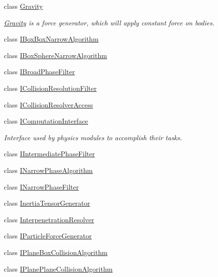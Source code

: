 \begin{DoxyCompactItemize}
\item 
class \mbox{\hyperlink{classr3_1_1_gravity}{Gravity}}
\begin{DoxyCompactList}\small\item\em \mbox{\hyperlink{classr3_1_1_gravity}{Gravity}} is a force generator, which will apply constant force on bodies. \end{DoxyCompactList}\item 
class \mbox{\hyperlink{classr3_1_1_i_box_box_narrow_algorithm}{I\+Box\+Box\+Narrow\+Algorithm}}
\item 
class \mbox{\hyperlink{classr3_1_1_i_box_sphere_narrow_algorithm}{I\+Box\+Sphere\+Narrow\+Algorithm}}
\item 
class \mbox{\hyperlink{classr3_1_1_i_broad_phase_filter}{I\+Broad\+Phase\+Filter}}
\item 
class \mbox{\hyperlink{classr3_1_1_i_collision_resolution_filter}{I\+Collision\+Resolution\+Filter}}
\item 
class \mbox{\hyperlink{classr3_1_1_i_collision_resolver_access}{I\+Collision\+Resolver\+Access}}
\item 
class \mbox{\hyperlink{classr3_1_1_i_computation_interface}{I\+Computation\+Interface}}
\begin{DoxyCompactList}\small\item\em Interface used by physics modules to accomplish their tasks. \end{DoxyCompactList}\item 
class \mbox{\hyperlink{classr3_1_1_i_intermediate_phase_filter}{I\+Intermediate\+Phase\+Filter}}
\item 
class \mbox{\hyperlink{classr3_1_1_i_narrow_phase_algorithm}{I\+Narrow\+Phase\+Algorithm}}
\item 
class \mbox{\hyperlink{classr3_1_1_i_narrow_phase_filter}{I\+Narrow\+Phase\+Filter}}
\item 
class \mbox{\hyperlink{classr3_1_1_inertia_tensor_generator}{Inertia\+Tensor\+Generator}}
\item 
class \mbox{\hyperlink{classr3_1_1_interpenetration_resolver}{Interpenetration\+Resolver}}
\item 
class \mbox{\hyperlink{classr3_1_1_i_particle_force_generator}{I\+Particle\+Force\+Generator}}
\item 
class \mbox{\hyperlink{classr3_1_1_i_plane_box_collision_algorithm}{I\+Plane\+Box\+Collision\+Algorithm}}
\item 
class \mbox{\hyperlink{classr3_1_1_i_plane_plane_collision_algorithm}{I\+Plane\+Plane\+Collision\+Algorithm}}

\end{DoxyCompactItemize}
